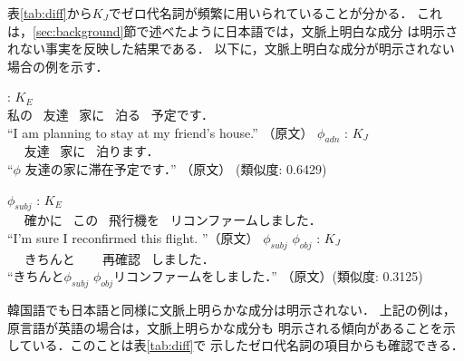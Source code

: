 表\ref{tab:diff}から$K_J$でゼロ代名詞が頻繁に用いられていることが分かる．
これは，\ref{sec:background}節で述べたように日本語では，文脈上明白な成分
は明示されない事実を反映した結果である．
以下に，文脈上明白な成分が明示されない場合の例を示す．
\begin{exe}
   \ex
  \begin{xlist}
\ex \label{e:a}  
\gll {}    : $K_E$\\
私の~ 友達~ 家に~ 泊る~ 予定です． 　\\
\trans ``I am planning to stay at my friend's house.'' （原文）
   \ex\label{e:b} \gll
   $\phi_{adn}$    : $K_J$\\
   　 友達~ 家に~ 泊ります． 　\\
   \trans ``$\phi$ 友達の家に滞在予定です．'' （原文）
\hfill (類似度: 0.6429)
\end{xlist}
\end{exe}


 \begin{exe}
\ex
\begin{xlist}
  \ex\label{togo:eng} \gll
$\phi_{subj}$   
 : $K_E$\\
　 確かに~ この~ 飛行機を~ リコンファームしました． 　\\
      \trans    ``I'm sure I reconfirmed this flight. ''（原文）
  \ex\label{togo:ja} \gll
$\phi_{subj}$  $\phi_{obj}$ 
 : $K_J$\\
　 きちんと~ 　 再確認~ しました． 　\\
 \trans ``きちんと$\phi_{subj}$ $\phi_{obj}$リコンファームをしました．''
  （原文）\hfill (類似度: 0.3125)
\end{xlist}
\end{exe} 

韓国語でも日本語と同様に文脈上明らかな成分は明示されない．
上記の例は，原言語が英語の場合は，文脈上明らかな成分も
明示される傾向があることを示している．このことは表\ref{tab:diff}で
示したゼロ代名詞の項目からも確認できる．


